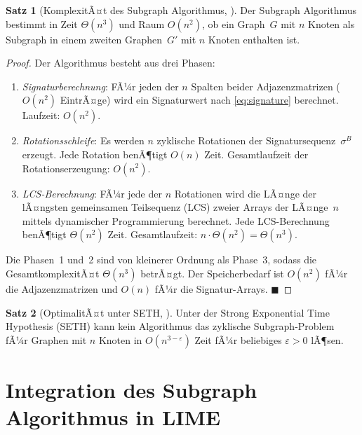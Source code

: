 ﻿\documentclass[a4paper,12pt]{article}
\theoremstyle{definition}
\newtheorem{satz}{Satz}[section]
\begin{document}
\begin{satz}[KomplexitÃ¤t des Subgraph Algorithmus, \citealt{Epp2026}]
  \label{satz:complexity}
  Der Subgraph Algorithmus bestimmt in Zeit $\Theta(n^3)$ und Raum $O(n^2)$, ob
  ein Graph~$G$ mit $n$ Knoten als Subgraph in einem zweiten Graphen~$G'$ mit $n$
  Knoten enthalten ist.
\end{satz}

\begin{proof}
  Der Algorithmus besteht aus drei Phasen:
  \begin{enumerate}
    \item \emph{Signaturberechnung}: FÃ¼r jeden der $n$ Spalten beider Adjazenzmatrizen
          ($O(n^2)$ EintrÃ¤ge) wird ein Signaturwert nach \eqref{eq:signature} berechnet.
          Laufzeit: $O(n^2)$.
    \item \emph{Rotationsschleife}: Es werden $n$ zyklische Rotationen der
          Signatursequenz~$\sigma^B$ erzeugt.
          Jede Rotation benÃ¶tigt $O(n)$ Zeit.
          Gesamtlaufzeit der Rotationserzeugung: $O(n^2)$.
    \item \emph{LCS-Berechnung}: FÃ¼r jede der $n$ Rotationen wird die LÃ¤nge der
          lÃ¤ngsten gemeinsamen Teilsequenz (LCS) zweier Arrays der LÃ¤nge~$n$ mittels
          dynamischer Programmierung berechnet.
          Jede LCS-Berechnung benÃ¶tigt $\Theta(n^2)$ Zeit.
          Gesamtlaufzeit: $n \cdot \Theta(n^2) = \Theta(n^3)$.
  \end{enumerate}

  Die Phasen~1 und~2 sind von kleinerer Ordnung als Phase~3, sodass die
  GesamtkomplexitÃ¤t $\Theta(n^3)$ betrÃ¤gt.
  Der Speicherbedarf ist $O(n^2)$ fÃ¼r die Adjazenzmatrizen und $O(n)$ fÃ¼r
  die Signatur-Arrays. \hfill$\blacksquare$
\end{proof}

\begin{satz}[OptimalitÃ¤t unter SETH, \citealt{Epp2026}]
  Unter der Strong Exponential Time Hypothesis (SETH) kann kein Algorithmus das
  zyklische Subgraph-Problem fÃ¼r Graphen mit $n$ Knoten in
  $O(n^{3-\varepsilon})$ Zeit fÃ¼r beliebiges $\varepsilon > 0$ lÃ¶sen.
\end{satz}

\section{Integration des Subgraph Algorithmus in LIME}
\end{document}
